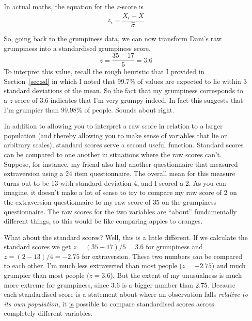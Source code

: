 \vspace{0.5cm}
\begin{mdframed}[style=MyFrame,nobreak=true]
In actual maths, the equation for the $z$-score is
$$
z_i = \frac{X_i - \bar{X}}{\hat\sigma}
$$
\end{mdframed}

So, going back to the grumpiness data, we can now transform Dani's raw grumpiness into a standardised grumpiness score.
$$
z = \frac{35 - 17}{5} = 3.6
$$
To interpret this value, recall the rough heuristic that I provided in Section~\ref{sec:sd} in which I noted that 99.7\% of values are expected to lie within 3 standard deviations of the mean. So the fact that my grumpiness corresponds to a $z$ score of 3.6 indicates that I'm very grumpy indeed. In fact this suggests that I'm grumpier than 99.98\% of people. Sounds about right. 

In addition to allowing you to interpret a raw score in relation to a larger population (and thereby allowing you to make sense of variables that lie on arbitrary scales), standard scores serve a second useful function. Standard scores can be compared to one another in situations where the raw scores can't. Suppose, for instance, my friend also had another questionnaire that measured extraversion using a 24 item questionnaire. The overall mean for this measure turns out to be 13 with standard deviation 4, and I scored a 2. As you can imagine, it doesn't make a lot of sense to try to compare my raw score of 2 on the extraversion questionnaire to my raw score of 35 on the grumpiness questionnaire. The raw scores for the two variables are ``about'' fundamentally different things, so this would be like comparing apples to oranges.

What about the standard scores? Well, this is a little different. If we calculate the standard scores we get $z = (35-17)/5 = 3.6$ for grumpiness and $z = (2-13)/4 = -2.75$ for extraversion. These two numbers {\it can} be compared to each other. I'm much less extraverted than most people ($z = -2.75$) and much grumpier than most people ($z = 3.6$). But the extent of my unusualness is much more extreme for grumpiness, since 3.6 is a bigger number than 2.75. Because each standardised score is a statement about where an observation falls {\it relative to its own population}, it \underline{is} possible to compare standardised scores across completely different variables. 


